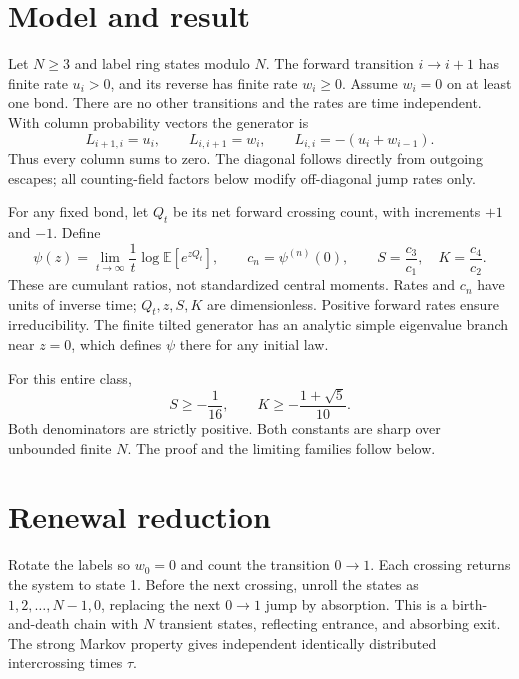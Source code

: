 \documentclass[aps,pre,preprint,superscriptaddress,nofootinbib]{revtex4-2}
\begin{document}
\section{Model and result}
Let $N\geq3$ and label ring states modulo $N$. The forward transition $i\to i+1$ has finite rate $u_i>0$, and its reverse has finite rate $w_i\geq0$. Assume $w_i=0$ on at least one bond. There are no other transitions and the rates are time independent. With column probability vectors the generator is
\begin{equation}
 L_{i+1,i}=u_i,\qquad L_{i,i+1}=w_i,\qquad
 L_{i,i}=-(u_i+w_{i-1}).
 \label{eq:generator}
\end{equation}
Thus every column sums to zero. The diagonal follows directly from outgoing escapes; all counting-field factors below modify off-diagonal jump rates only.

For any fixed bond, let $Q_t$ be its net forward crossing count, with increments $+1$ and $-1$. Define
\begin{equation}
 \psi(z)=\lim_{t\to\infty}\frac{1}{t}
 \log\mathbb E[e^{zQ_t}],\qquad c_n=\psi^{(n)}(0),\qquad
 S=\frac{c_3}{c_1},\quad K=\frac{c_4}{c_2}.
 \label{eq:observable}
\end{equation}
These are cumulant ratios, not standardized central moments.
Rates and $c_n$ have units of inverse time; $Q_t,z,S,K$ are dimensionless.
Positive forward rates ensure irreducibility. The finite tilted generator has an analytic simple eigenvalue branch near $z=0$, which defines $\psi$ there for any initial law.

For this entire class,
\begin{equation}
 \boxed{S\geq-\frac{1}{16},\qquad
 K\geq-\frac{1+\sqrt{5}}{10}.}
 \label{eq:bounds}
\end{equation}
Both denominators are strictly positive. Both constants are sharp over unbounded finite $N$. The proof and the limiting families follow below.

\section{Renewal reduction}
Rotate the labels so $w_0=0$ and count the transition $0\to1$. Each crossing returns the system to state 1. Before the next crossing, unroll the states as $1,2,\ldots,N-1,0$, replacing the next $0\to1$ jump by absorption. This is a birth-and-death chain with $N$ transient states, reflecting entrance, and absorbing exit. The strong Markov property gives independent identically distributed intercrossing times $\tau$.
\end{document}
